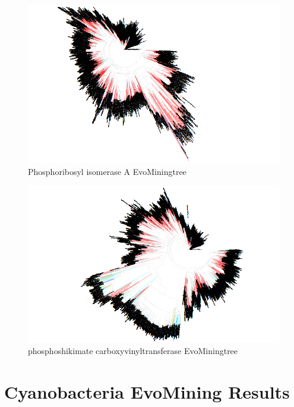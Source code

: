 \documentclass[12pt,twoside]{reedthesis}
\begin{document}
\begin{figure}[h!tbp]
  \end{figure}\begin{figure}[h!tbp]
  \centering
  \includegraphics[angle = 180,scale = 0.3]{chapter4/tree47.png}
  \caption[Phosphoribosyl isomerase A EvoMiningtree]{\normalsize{Phosphoribosyl isomerase A EvoMiningtree}}
  \label{fig:Phosphoribosyl_isomerase_A_evo_tree}
  \end{figure}\begin{figure}[h!tbp]
  \centering
  \includegraphics[angle = 180,scale = 0.3]{chapter4/tree69.png}
  \caption[phosphoshikimate carboxyvinyltransferase EvoMiningtree]{\normalsize{phosphoshikimate carboxyvinyltransferase EvoMiningtree}}
  \label{fig:phosphoshikimate_c_evo_tree}
  \end{figure}
  
  \clearpage 
  
  \hypertarget{refux5flabels}{\chapter{Cyanobacteria EvoMining
  Results}\label{refux5flabels}}
  
\end{document}
